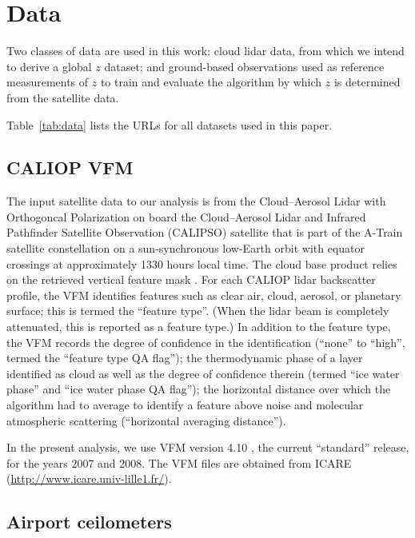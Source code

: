\documentclass[essd,manuscript]{copernicus}\usepackage[]{graphicx}\usepackage[]{color}
\newcommand\CBH{\ensuremath{z}}
\begin{document}
\section{Data}
\label{sec:data}

Two classes of data are used in this work: cloud lidar data, from which we
intend to derive a global \CBH{} dataset; and ground-based observations used as
reference measurements of \CBH{} to train and evaluate the algorithm by which
\CBH{} is determined from the satellite data.

Table~\ref{tab:data} lists the URLs for all datasets used in this paper.

\subsection{CALIOP VFM}

The input satellite data to our analysis is from the Cloud--Aerosol Lidar with
Orthogoncal Polarization \citep[CALIOP,][]{Winker2007} on board the Cloud--Aerosol Lidar and Infrared Pathfinder
Satellite Observation (CALIPSO) satellite that is part of the A-Train
satellite constellation \citep{Stephens2002} on a
sun-synchronous low-Earth orbit with equator crossings at approximately 1330 hours local
time. The cloud base product relies on the retrieved vertical feature mask
\citep[VFM,][]{vaughan2002}.  For each CALIOP lidar backscatter profile, the VFM identifies features
such as clear air, cloud, aerosol, or planetary surface; this is termed the ``feature
type''.  (When the lidar beam is completely attenuated, this is reported as a
feature type.)  In addition to the feature type, the VFM records the degree of
confidence in the identification (``none'' to ``high'', termed the ``feature
type QA flag''); the thermodynamic phase of a layer identified as cloud as well
as the degree of confidence therein (termed ``ice water phase'' and ``ice water
phase QA flag''); the horizontal distance over which the algorithm had to
average to identify a feature above noise and molecular atmospheric scattering
(``horizontal averaging distance'').  

In the present analysis, we use VFM version 4.10 \citep{vfm}, the current
``standard'' release, for the years 2007 and 2008.  The VFM files are obtained
from ICARE (\url{http://www.icare.univ-lille1.fr/}).

\subsection{Airport ceilometers}
\end{document}
